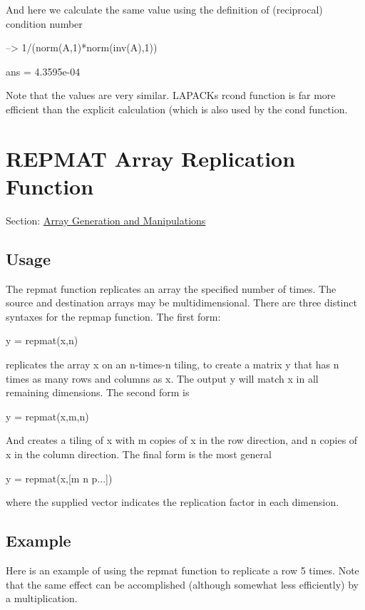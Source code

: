 And here we calculate the same value using the definition of (reciprocal) condition number


\begin{DoxyVerbInclude}
--> 1/(norm(A,1)*norm(inv(A),1))

ans = 
 4.3595e-04 
\end{DoxyVerbInclude}


Note that the values are very similar. L\-A\-P\-A\-C\-Ks {\ttfamily rcond} function is far more efficient than the explicit calculation (which is also used by the {\ttfamily cond} function. \hypertarget{array_repmat}{}\section{R\-E\-P\-M\-A\-T Array Replication Function}\label{array_repmat}
Section\-: \hyperlink{sec_array}{Array Generation and Manipulations} \hypertarget{vtkwidgets_vtkxyplotwidget_Usage}{}\subsection{Usage}\label{vtkwidgets_vtkxyplotwidget_Usage}
The {\ttfamily repmat} function replicates an array the specified number of times. The source and destination arrays may be multidimensional. There are three distinct syntaxes for the {\ttfamily repmap} function. The first form\-: \begin{DoxyVerb}  y = repmat(x,n)
\end{DoxyVerb}
 replicates the array {\ttfamily x} on an {\ttfamily n-\/times-\/n} tiling, to create a matrix {\ttfamily y} that has {\ttfamily n} times as many rows and columns as {\ttfamily x}. The output {\ttfamily y} will match {\ttfamily x} in all remaining dimensions. The second form is \begin{DoxyVerb}  y = repmat(x,m,n)
\end{DoxyVerb}
 And creates a tiling of {\ttfamily x} with {\ttfamily m} copies of {\ttfamily x} in the row direction, and {\ttfamily n} copies of {\ttfamily x} in the column direction. The final form is the most general \begin{DoxyVerb}  y = repmat(x,[m n p...])
\end{DoxyVerb}
 where the supplied vector indicates the replication factor in each dimension. \hypertarget{variables_struct_Example}{}\subsection{Example}\label{variables_struct_Example}
Here is an example of using the {\ttfamily repmat} function to replicate a row 5 times. Note that the same effect can be accomplished (although somewhat less efficiently) by a multiplication.


